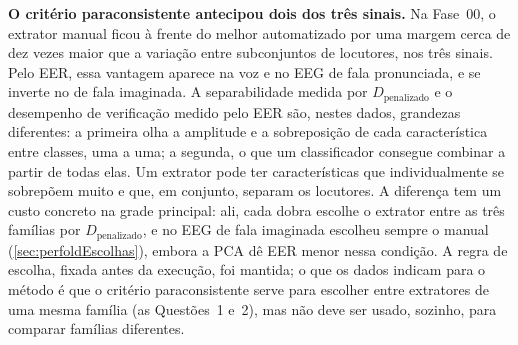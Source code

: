 	\par \textbf{O critério paraconsistente antecipou dois dos três sinais.} Na
	Fase~00, o extrator manual ficou à frente do melhor automatizado por uma
	margem cerca de dez vezes maior que a variação entre subconjuntos de
	locutores, nos três sinais. Pelo \ac{EER}, essa vantagem aparece na voz e no
	\ac{EEG} de fala pronunciada, e se inverte no de fala imaginada. A
	separabilidade medida por $D_{\text{penalizado}}$ e o desempenho de
	verificação medido pelo \ac{EER} são, nestes dados, grandezas diferentes:
	a primeira olha a amplitude e a sobreposição de cada característica entre
	classes, uma a uma; a segunda, o que um classificador consegue combinar a
	partir de todas elas. Um extrator pode ter características que
	individualmente se sobrepõem muito e que, em conjunto, separam os locutores.
	A diferença tem um custo concreto na grade principal: ali, cada dobra escolhe
	o extrator entre as três famílias por $D_{\text{penalizado}}$, e no \ac{EEG}
	de fala imaginada escolheu sempre o manual
	(\autoref{sec:perfoldEscolhas}), embora a \ac{PCA} dê \ac{EER} menor nessa
	condição. A regra de escolha, fixada antes da execução, foi mantida; o que
	os dados indicam para o método é que o critério paraconsistente serve para
	escolher entre extratores de uma mesma família (as Questões~1 e~2), mas não
	deve ser usado, sozinho, para comparar famílias diferentes.

